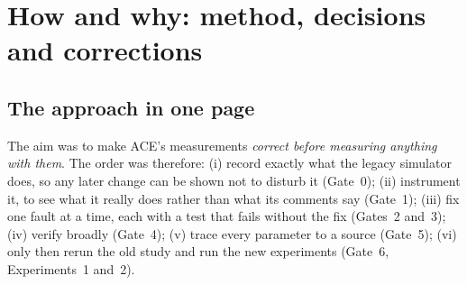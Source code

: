 \chapter{How and why: method, decisions and corrections}
\label{ch:how}

\section{The approach in one page}
The aim was to make ACE's measurements \emph{correct before measuring anything with them}. The order was therefore: (i) record exactly what the legacy simulator does, so any later change can be shown not to disturb it (Gate~0);
(ii) instrument it, to see what it really does rather than what its comments say (Gate~1); (iii) fix one fault at a time, each with a test that fails without the fix (Gates~2 and~3); (iv) verify broadly (Gate~4); (v) trace every parameter to a source (Gate~5);
(vi) only then rerun the old study and run the new experiments (Gate~6, Experiments~1 and~2).

